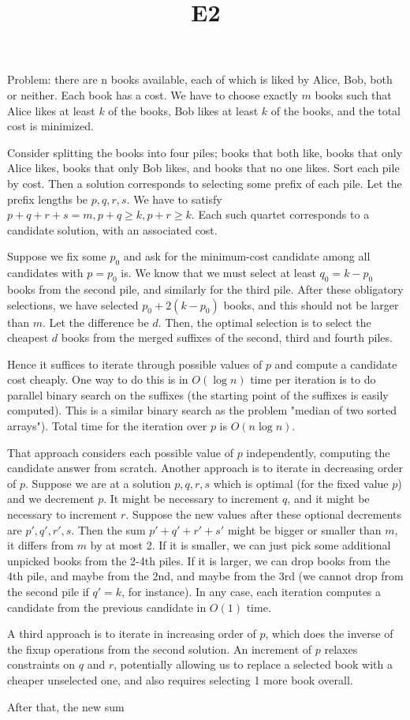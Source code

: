 \documentclass{article}
\title{E2}
\date{}
\begin{document}
\maketitle

Problem: there are n books available, each of which is liked by Alice, Bob, both or neither. Each book has a cost. We have to choose exactly $m$ books such that Alice likes at least $k$ of the books, Bob likes at least $k$ of the books, and the total cost is minimized.

Consider splitting the books into four piles; books that both like, books that only Alice likes, books that only Bob likes, and books that no one likes. Sort each pile by cost. Then a solution corresponds to selecting some prefix of each pile. Let the prefix lengths be $p, q, r, s$. We have to satisfy $p+q+r+s = m, p + q \ge k, p + r \ge k$. Each such quartet corresponds to a candidate solution, with an associated cost.

Suppose we fix some $p_0$ and ask for the minimum-cost candidate among all candidates with $p = p_0$ is. We know that we must select at least $q_0 = k - p_0$ books from the second pile, and similarly for the third pile. After these obligatory selections, we have selected $p_0 + 2(k-p_0)$ books, and this should not be larger than $m$. Let the difference be $d$. Then, the optimal selection is to select the cheapest $d$ books from the merged suffixes of the second, third and fourth piles.

Hence it suffices to iterate through possible values of $p$ and compute a candidate cost cheaply. One way to do this is in $O(\log n)$ time per iteration is to do parallel binary search on the suffixes (the starting point of the suffixes is easily computed). This is a similar binary search as the problem "median of two sorted arrays"). Total time for the iteration over $p$ is $O(n \log n)$.

That approach considers each possible value of $p$ independently, computing the candidate answer from scratch. Another approach is to iterate in decreasing order of $p$. Suppose we are at a solution $p, q, r, s$ which is optimal (for the fixed value $p$) and we decrement $p$. It might be necessary to increment $q$, and it might be necessary to increment $r$. Suppose the new values after these optional decrements are $p', q', r', s$. Then the sum $p' + q' + r' + s'$ might be bigger or smaller than $m$, it differs from $m$ by at most 2. If it is smaller, we can just pick some additional unpicked books from the 2-4th piles. If it is larger, we can drop books from the 4th pile, and maybe from the 2nd, and maybe from the 3rd (we cannot drop from the second pile if $q' = k$, for instance). In any case, each iteration computes a candidate from the previous candidate in $O(1)$ time.

A third approach is to iterate in increasing order of $p$, which does the inverse of the fixup operations from the second solution. An increment of $p$ relaxes constraints on $q$ and $r$, potentially allowing us to replace a selected book with a cheaper unselected one, and also requires selecting 1 more book overall.

 After that, the new sum 
\end{document}
